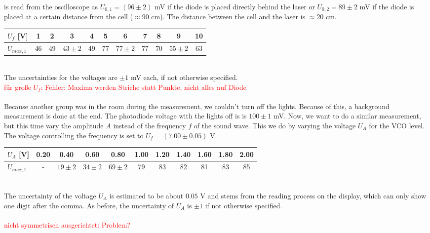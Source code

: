 is read from the oscilloscope as $U_{0,1}=(96\pm2)$ mV if the diode is
placed directly behind the laser or $U_{0,2}=89\pm2$ mV if the
diode is placed at a certain distance from the cell ($\approx 90$ cm).
The distance between the cell and the laser is $\approx 20$ cm. \\
\begin{center}
    \begin{tabular}{l|cccccccccc}
        $U_f$ [V] & 1 & 2 & 3 & 4 & 5 & 6 & 7 & 8 & 9 & 10 \\
        \hline
        $U_{max,1}$ & 46 & 49 & $43\pm2$ & 49 & 77 & $77\pm2$ & 77 & 70 &
        $55\pm2$ & 63
    \end{tabular}
\end{center} \null \ \\
The uncertainties for the voltages are $\pm1$ mV each, if not otherwise
specified. \\
\textcolor{red}{für große $U_f$: Fehler: Maxima werden Striche statt Punkte, nicht alles auf Diode} \\ \\
Because another group was in the room during the measurement, we couldn't
turn off the lights. Because of this, a background measurement is done at
the end. The photodiode voltage with the lights off is
is $100\pm1$ mV. \newpage \noindent
Now, we want to do a similar measurement, but this time vary the amplitude
$A$ instead of the frequency $f$ of the sound wave. This we do by varying the
voltage $U_A$ for the VCO level. The voltage controlling the frequency
is set to $U_f=(7.00\pm0.05)$ V.
\begin{center}
    \begin{tabular}{l|cccccccccc}
        $U_A$ [V] & 0.20 & 0.40 & 0.60 & 0.80 & 1.00 &
        1.20 & 1.40 & 1.60 & 1.80 & 2.00 \\
        \hline
        $U_{max,1}$ & - & $19\pm2$ & $34\pm2$ & $69\pm2$ & 79 & 83 & 82 &
        81 & 83 & 85
    \end{tabular}
\end{center} \null \ \\
The uncertainty of the voltage $U_A$ is estimated to be about $0.05$ V and
stems from the reading process on the display, which can only show
one digit after the comma. As before, the uncertainty of $U_A$
is $\pm1$ if not otherwise specified. \\ \\
\textcolor{red}{nicht symmetrisch ausgerichtet: Problem?}

